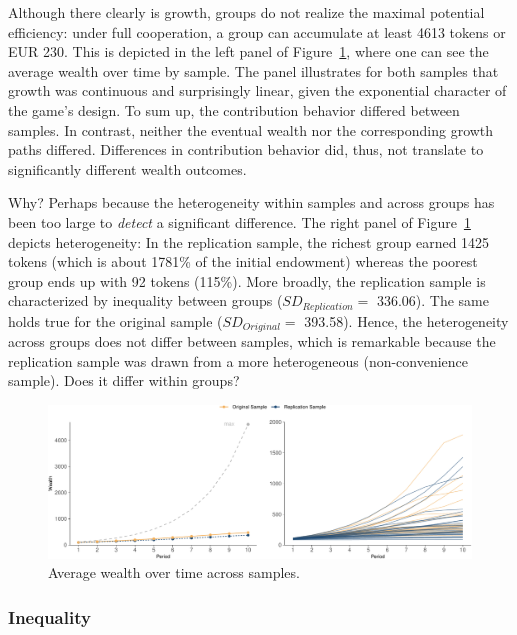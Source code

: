 \documentclass[
  authoryear,
  preprint,
  3p]{elsarticle}
\begin{document}
Although there clearly is growth, groups do not realize the maximal
potential efficiency: under full cooperation, a group can accumulate at
least 4613 tokens or EUR 230. This is depicted in the left panel of
Figure~\ref{fig-growth-heterogeneity}, where one can see the average
wealth over time by sample. The panel illustrates for both samples that
growth was continuous and surprisingly linear, given the exponential
character of the game's design. To sum up, the contribution behavior
differed between samples. In contrast, neither the eventual wealth nor
the corresponding growth paths differed. Differences in contribution
behavior did, thus, not translate to significantly different wealth
outcomes.

Why? Perhaps because the heterogeneity within samples and across groups
has been too large to \emph{detect} a significant difference. The right
panel of Figure~\ref{fig-growth-heterogeneity} depicts heterogeneity: In
the replication sample, the richest group earned 1425 tokens (which is
about 1781\% of the initial endowment) whereas the poorest group ends up
with 92 tokens (115\%). More broadly, the replication sample is
characterized by inequality between groups (\(SD_{Replication} =\)
336.06). The same holds true for the original sample
(\(SD_{Original} =\) 393.58). Hence, the heterogeneity across groups
does not differ between samples, which is remarkable because the
replication sample was drawn from a more heterogeneous (non-convenience
sample). Does it differ within groups?

\begin{figure}

{\centering \includegraphics{paper_files/figure-pdf/fig-growth-heterogeneity-1.pdf}

}

\caption{\label{fig-growth-heterogeneity}Average wealth over time across
samples.}

\end{figure}

\hypertarget{sec-inequality}{%
\subsubsection{Inequality}\label{sec-inequality}}
\end{document}
